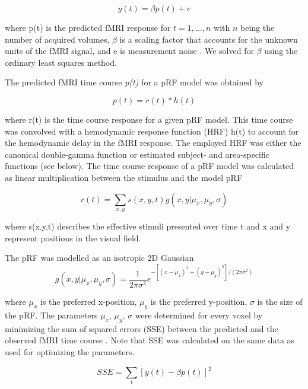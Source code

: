 \begin{equation}
y(t) = \beta p(t) + e
\end{equation}

where p(t) is the predicted fMRI response for $t = {1,..., n}$ with $n$ being the number of acquired volumes, $\beta$ is a scaling factor that accounts for the unknown units of the fMRI signal, and e is measurement noise \parencite{Dumoulin2008}. We solved for $\beta$ using the ordinary least squares method.

The predicted fMRI time course \textit{p(t)} for a pRF model was obtained by

\begin{equation}
p(t) = r(t) \ast h(t)
\end{equation}

where r(t) is the time course response for a given pRF model. This time course was convolved with a hemodynamic response function (HRF) h(t) to account for the hemodynamic delay in the fMRI response. The employed HRF was either the canonical double-gamma function \parencite{Friston1998} or estimated subject- and area-specific functions (see below). The time course response of a pRF model was calculated as linear multiplication between the stimulus and the model pRF

\begin{equation}
r(t) = \sum_{x,y} s(x,y,t) g(x, y|\mu_x,\mu_y,\sigma)
\end{equation}

where s(x,y,t) describes the effective stimuli presented over time t and x and y represent positions in the visual field.

The pRF was modelled as an isotropic 2D Gaussian
\begin{equation}
g(x, y|\mu_x,\mu_y,\sigma) = \frac{1}{2\pi\sigma^2} e^{-[(x-\mu_x)^2 + (y-\mu_y)^2] / (2\pi\sigma^2)}
\end{equation}

where $\mu_x$ is the preferred x-position, $\mu_y$ is the preferred y-position, $\sigma$ is the size of the pRF. The parameters $\mu_x$, $\mu_y$, $\sigma$ were determined for every voxel by minimizing the sum of squared errors (SSE) between the predicted and the observed fMRI time course \parencite{Dumoulin2008}. Note that SSE was calculated on the same data as used for optimizing the parameters.

\begin{equation}
SSE = \sum_{t}[y(t) - \beta p(t)]^2
\label{eq:SSE}
\end{equation}

